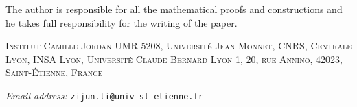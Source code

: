 \documentclass[11pt,a4paper]{article}
\theoremstyle{definition}
\theoremstyle{remark}
\numberwithin{equation}{section}
\begin{document}
The author is responsible for all the mathematical proofs and constructions and he takes full responsibility for the writing of the paper. 




\bigskip
\noindent
{\footnotesize\scshape
Institut Camille Jordan UMR 5208,
Université Jean Monnet, CNRS, Centrale Lyon,
INSA Lyon, Université Claude Bernard Lyon 1,
20, rue Annino, 42023, Saint-Étienne, France
}

\par\smallskip
\noindent
{\footnotesize
\textit{Email address:}
\texttt{zijun.li@univ-st-etienne.fr}
}
\end{document}
